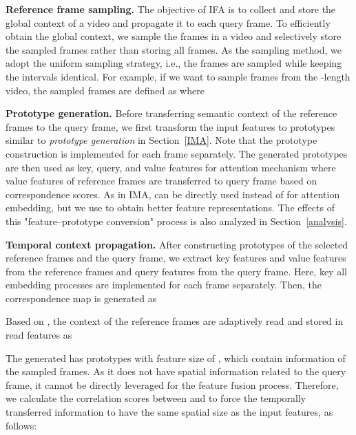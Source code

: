 \documentclass[10pt,twocolumn,letterpaper]{article}
\begin{document}
\vspace{1mm}
\noindent\textbf{Reference frame sampling.} The objective of IFA is to collect and store the global context of a video and propagate it to each query frame. To efficiently obtain the global context, we sample the frames in a video and selectively store the sampled frames rather than storing all frames. As the sampling method, we adopt the uniform sampling strategy, i.e., the frames are sampled while keeping the intervals identical. For example, if we want to sample  frames from the -length video, the sampled frames are defined as  where




\vspace{1mm}
\noindent\textbf{Prototype generation.} Before transferring semantic context of the reference frames to the query frame, we first transform the input features  to prototypes  similar to \textit{prototype generation} in Section~\ref{IMA}. Note that the prototype construction is implemented for each frame separately. The generated prototypes are then used as key, query, and value features for attention mechanism where value features of reference frames are transferred to query frame based on correspondence scores. As in IMA,  can be directly used instead of  for attention embedding, but we use  to obtain better feature representations. The effects of this "feature--prototype conversion" process is also analyzed in Section~\ref{analysis}.



\vspace{1mm}
\noindent\textbf{Temporal context propagation.} After constructing prototypes of the selected reference frames and the query frame, we extract key features  and value features  from the reference frames and query features  from the query frame. Here, key all embedding processes are implemented for each frame separately. Then, the correspondence map  is generated as

Based on , the context of the reference frames are adaptively read and stored in read features  as

The generated  has  prototypes with feature size of , which contain information of the sampled frames. As it does not have spatial information related to the query frame, it cannot be directly leveraged for the feature fusion process. Therefore, we calculate the correlation scores  between  and  to force the temporally transferred information to have the same spatial size as the input features, as follows:
\end{document}
